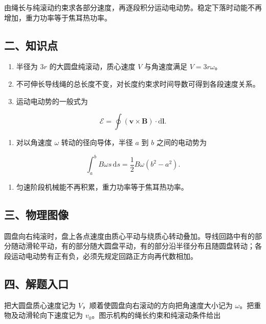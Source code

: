 \documentclass[12pt,a4paper,UTF8]{ctexart}
\newcommand{\tightlist}{\setlength{\itemsep}{0pt}\setlength{\parskip}{0pt}}
\begin{document}
由绳长与纯滚动约束求各部分速度，再逐段积分运动电动势。稳定下落时动能不再增加，重力功率等于焦耳热功率。

\subsection{二、知识点}\label{ux4e8cux77e5ux8bc6ux70b9-4}

\begin{enumerate}
\def\labelenumi{\arabic{enumi}.}
\tightlist
\item
  半径为 \(3r\) 的大圆盘纯滚动，质心速度 \(V\) 与角速度满足
  \(V=3r\omega\)。
\item
  不可伸长导线绳的总长度不变，对长度约束求时间导数可得到各段速度关系。
\item
  运动电动势的一般式为
\end{enumerate}

\[\mathcal E=\oint(\bm v\times\bm B)\cdot\mathrm d\bm l.\]

\begin{enumerate}
\def\labelenumi{\arabic{enumi}.}
\setcounter{enumi}{3}
\tightlist
\item
  对以角速度 \(\omega\) 转动的径向导体，半径 \(a\) 到 \(b\)
  之间的电动势为
\end{enumerate}

\[\int_a^bB\omega s\,\mathrm ds=\frac12B\omega(b^2-a^2).\]

\begin{enumerate}
\def\labelenumi{\arabic{enumi}.}
\setcounter{enumi}{4}
\tightlist
\item
  匀速阶段机械能不再积累，重力功率等于焦耳热功率。
\end{enumerate}

\subsection{三、物理图像}\label{ux4e09ux7269ux7406ux56feux50cf-4}

圆盘向右纯滚时，盘上各点速度由质心平动与绕质心转动叠加。导线回路中有的部分随动滑轮平动，有的部分随大圆盘平动，有的部分沿半径分布且随圆盘转动；各段运动电动势有正有负，必须先规定回路正方向再代数相加。

\subsection{四、解题入口}\label{ux56dbux89e3ux9898ux5165ux53e3-4}

把大圆盘质心速度记为 \(V\)，顺着使圆盘向右滚动的方向把角速度大小记为
\(\omega\)。把重物及动滑轮向下速度记为
\(v_0\)。图示机构的绳长约束和纯滚动条件给出
\end{document}
